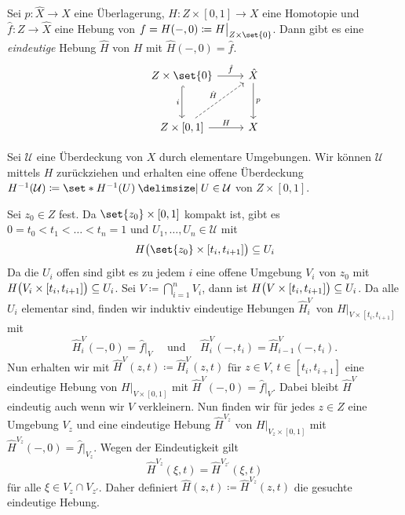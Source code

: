 \begin{satz}[{name={Homotopiehebungssatz}},label=satz:hebung-homotopie]
	Sei $p \colon \hat{X} \to X$ eine Überlagerung, $H \colon Z \times [0,1] \to X$ eine Homotopie und $\hat{f} \colon Z \to \hat{X}$ eine Hebung von $f = H(-,0) \coloneqq H\big|_{Z \times \set{0}}$. 
	Dann gibt es eine \emph{eindeutige} Hebung $\hat{H}$ von $H$ mit $\hat{H}(-,0)= \hat{f}$.
	\[
		\begin{tikzcd}[row sep=3em]
			Z \times \set{0} \dar[hook, swap]{i} \rar{\hat{f}}& \hat{X} \dar{p} \\
			Z \times [0,1] \urar[dashed]{\hat{H}} \rar{H}& X  
		\end{tikzcd}
	\]
\end{satz}
\begin{beweis}
	Sei $\mathcal{U}$ eine Überdeckung von $X$ durch elementare Umgebungen. 
	Wir können $\mathcal{U}$ mittels $H$ zurückziehen und erhalten eine offene Überdeckung $H ^{-1}(\mathcal{U}) \coloneqq \set*{H ^{-1}(U) \given U \in \mathcal{U}}$ von $Z \times [0,1]$. 
	
	Sei $z_0 \in Z$ fest. Da $\set{z_0} \times [0,1]$ kompakt ist, gibt es $0 = t_0 < t_1 < \ldots < t_n=1$ und $U_1, \ldots , U_n \in \mathcal{U}$ mit
	\[
		H \enbrace[\big]{\set{z_0} \times [t_i, t_{i+1}] } \subseteq U_i
	\]
	Da die $U_i$ offen sind gibt es zu jedem $i$ eine offene Umgebung $V_i$ von $z_0$ mit $H\enbrace[\big]{V_i \times[t_i, t_{i+1}]} \subseteq U_i$. 
	Sei $V \coloneqq \bigcap_{i=1}^n V_i$, dann ist $H \enbrace[\big]{V \times [t_i, t_{i+1}]} \subseteq U_i$. 
	Da alle $U_i$ elementar sind, finden wir induktiv eindeutige Hebungen $\hat{H}_i^V$ von $H\big|_{V \times [t_i, t_{i+1}]}$ mit 
	\[
		\hat{H}_i^V(-,0)= \hat{f}\big|_{V}\quad \text{ und } \quad \hat{H}_i^V(-,t_{i}) = \hat{H}_{i-1}^V (-, t_{i}).
	\]
	Nun erhalten wir mit $\hat{H}^V(z,t) \coloneqq \hat{H}_i^V(z,t)$ für $z \in V$, $t \in [t_{i},t_{i+1}]$ eine eindeutige Hebung von $H\big|_{V \times [0,1]}$ mit $\hat{H}^V(-,0) = \hat{f}\big|_V$. 
	Dabei bleibt $\hat{H}^V$ eindeutig auch wenn wir $V$ verkleinern. 
	Nun finden wir für jedes $z \in Z$ eine Umgebung $V_z$ und eine eindeutige Hebung $\hat{H}^{V_z}$ von $H\big|_{V_z \times [0,1]}$ mit 
	\(
		\hat{H}^{V_z} (-,0) = \hat{f}\big|_{V_z}
	\).
	Wegen der Eindeutigkeit gilt 
	\[
		\hat{H}^{V_z} (\xi,t) = \hat{H}^{V_{z'}}(\xi,t)
	\]
	für alle $\xi \in V_z \cap V_{z'}$. 
	Daher definiert $\hat{H}(z,t) \coloneqq \hat{H}^{V_z}(z,t)$ die gesuchte eindeutige Hebung.
\end{beweis}

